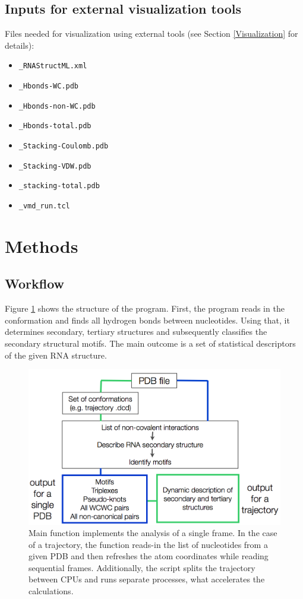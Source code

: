 \documentclass[12pt]{article}
\begin{document}
\subsection{Inputs for external visualization tools} 
Files needed for visualization using external tools (see Section \ref{Visualization} for details):
\begin{itemize}
\item {\tt \_RNAStructML.xml} 
\item {\tt \_Hbonds-WC.pdb}
\item {\tt \_Hbonds-non-WC.pdb}
\item {\tt \_Hbonds-total.pdb}
\item {\tt \_Stacking-Coulomb.pdb}
\item {\tt \_Stacking-VDW.pdb}
\item {\tt \_stacking-total.pdb}
\item {\tt \_vmd\_run.tcl}
\end{itemize}


\section{Methods}
\subsection{Workflow}
Figure \ref{ProgramScheme} shows the structure of the program. First, the program reads in the conformation and finds all hydrogen bonds between nucleotides. Using that, it determines secondary, tertiary structures and subsequently classifies the secondary structural motifs. The main outcome is a set of statistical descriptors of the given RNA structure.  
\begin{figure}[hbt!]
\centering
\includegraphics[scale=0.4]{./pictures/workflow.png}
\caption{Main function implements the analysis of a single frame. In the case of a trajectory, the function reads-in the list of nucleotides from a given PDB and then refreshes the atom coordinates while reading sequential frames. Additionally, the script splits the trajectory between CPUs and runs separate processes, what  accelerates the calculations.}
\label{ProgramScheme}
\end{figure}
\end{document}
